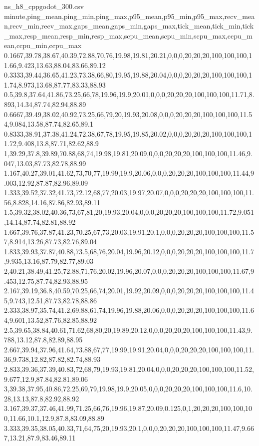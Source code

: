 \begin{filecontents*}[overwrite]{ns_h8_cppgodot_300.csv}
minute,ping_mean,ping_min,ping_max,p95_mean,p95_min,p95_max,recv_mean,recv_min,recv_max,gaps_mean,gaps_min,gaps_max,tick_mean,tick_min,tick_max,resp_mean,resp_min,resp_max,scpu_mean,scpu_min,scpu_max,ccpu_mean,ccpu_min,ccpu_max
0.1667,39.78,38.67,40.39,72.88,70,76,19.98,19.81,20.21,0,0,0,20,20,20,100,100,100,11.66,9.423,13.63,88.04,83.66,89.12
0.3333,39.44,36.65,41.23,73.38,66,80,19.95,19.88,20.04,0,0,0,20,20,20,100,100,100,11.74,8.973,13.68,87.77,83.33,88.93
0.5,39.8,37.64,41.86,73.25,66,78,19.96,19.9,20.01,0,0,0,20,20,20,100,100,100,11.71,8.893,14.34,87.74,82.94,88.89
0.6667,39.49,38.02,40.92,73.25,66,79,20,19.93,20.08,0,0,0,20,20,20,100,100,100,11.54,9.084,13.58,87.74,82.65,89.1
0.8333,38.91,37.38,41.24,72.38,67,78,19.95,19.85,20.02,0,0,0,20,20,20,100,100,100,11.72,9.408,13.8,87.71,82.62,88.9
1,39.29,37.8,39.89,70.88,68,74,19.98,19.81,20.09,0,0,0,20,20,20,100,100,100,11.46,9.047,13.03,87.73,82.78,88.99
1.167,40.27,39.01,41.62,73,70,77,19.99,19.9,20.06,0,0,0,20,20,20,100,100,100,11.44,9.003,12.92,87.87,82.96,89.09
1.333,39.52,37.32,41.73,72.12,68,77,20.03,19.97,20.07,0,0,0,20,20,20,100,100,100,11.56,8.828,14.16,87.86,82.93,89.11
1.5,39.32,38.02,40.36,73,67,81,20,19.93,20.04,0,0,0,20,20,20,100,100,100,11.72,9.051,14.14,87.74,82.81,88.92
1.667,39.76,37.87,41.23,70.25,67,73,20.03,19.91,20.1,0,0,0,20,20,20,100,100,100,11.57,8.914,13.26,87.73,82.76,89.04
1.833,39.93,37.87,40.88,73.5,68,76,20.04,19.96,20.12,0,0,0,20,20,20,100,100,100,11.7,9.935,13.16,87.79,82.77,89.03
2,40.21,38.49,41.25,72.88,71,76,20.02,19.96,20.07,0,0,0,20,20,20,100,100,100,11.67,9.453,12.75,87.74,82.93,88.95
2.167,39.19,36.8,40.59,70.25,66,74,20.01,19.92,20.09,0,0,0,20,20,20,100,100,100,11.45,9.743,12.51,87.73,82.78,88.86
2.333,38.97,35.74,41.2,69.88,61,74,19.96,19.88,20.06,0,0,0,20,20,20,100,100,100,11.64,9.601,13.52,87.76,82.85,88.92
2.5,39.65,38.84,40.61,71.62,68,80,20,19.89,20.12,0,0,0,20,20,20,100,100,100,11.43,9.788,13.12,87.8,82.89,88.95
2.667,39.94,37.96,41.64,73.88,67,77,19.99,19.91,20.04,0,0,0,20,20,20,100,100,100,11.36,9.738,12.82,87.82,82.74,88.93
2.833,39.36,37.39,40.83,72,68,79,19.93,19.81,20.04,0,0,0,20,20,20,100,100,100,11.52,9.677,12.9,87.84,82.81,89.06
3,39.38,37.95,40.86,72.25,69,79,19.98,19.9,20.05,0,0,0,20,20,20,100,100,100,11.6,10.28,13.13,87.8,82.92,88.92
3.167,39.37,37.46,41.99,71.25,66,76,19.96,19.87,20.09,0.125,0,1,20,20,20,100,100,100,11.66,10.1,12.9,87.8,83.09,88.89
3.333,39.35,38.05,40.33,71,64,75,20,19.93,20.1,0,0,0,20,20,20,100,100,100,11.47,9.667,13.21,87.9,83.46,89.11

\end{filecontents*}

